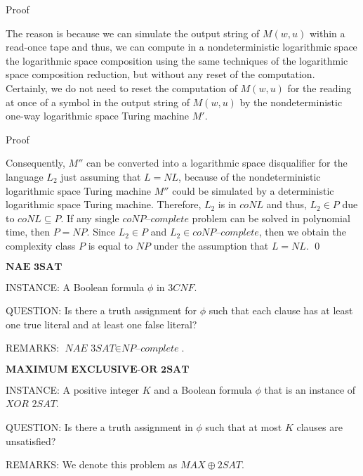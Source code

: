 \documentclass[11pt]{beamer}
\begin{document}
\begin{frame}{Proof}

The reason is because we can simulate the output string of $M(w, u)$ within a read-once tape and thus, we can compute in a nondeterministic logarithmic space the logarithmic space composition using the same techniques of the logarithmic space composition reduction, but without any reset of the computation. Certainly, we do not need to reset the computation of $M(w, u)$ for the reading at once of a symbol in the output string of $M(w, u)$ by the nondeterministic one-way logarithmic space Turing machine $M'$.

\end{frame}

\begin{frame}{Proof}

Consequently, $M''$ can be converted into a logarithmic space disqualifier for the language $L_{2}$ just assuming that $L = NL$, because of the nondeterministic logarithmic space Turing machine $M''$ could be simulated by a deterministic logarithmic space Turing machine. Therefore, $L_{2}$ is in $coNL$ and thus, $L_{2} \in P$ due to $coNL \subseteq P$. If any single $\textit{coNP--complete}$ problem can be solved in polynomial time, then $P = NP$. Since $L_{2} \in P$ and $L_{2} \in \textit{coNP--complete}$, then we obtain the complexity class $P$ is equal to $NP$ under the assumption that $L = NL$. \qed

\end{frame}

\begin{frame}{$\textbf{NAE 3SAT}$}

\begin{definition}
INSTANCE: A Boolean formula $\phi$ in $3CNF$.

QUESTION: Is there a truth assignment for $\phi$ such that each clause has at least one true literal and at least one false literal?

REMARKS: $\textit{NAE 3SAT} \in \textit{NP--complete}$.
\end{definition}

\end{frame}

\begin{frame}{$\textbf{MAXIMUM EXCLUSIVE-OR 2SAT}$}

\begin{definition}
INSTANCE: A positive integer $K$ and a Boolean formula $\phi$ that is an instance of $\textit{XOR 2SAT}$.

QUESTION: Is there a truth assignment in $\phi$ such that at most $K$ clauses are unsatisfied?

REMARKS: We denote this problem as $MAX\oplus2SAT$.
\end{definition}

\end{frame}
\end{document}
